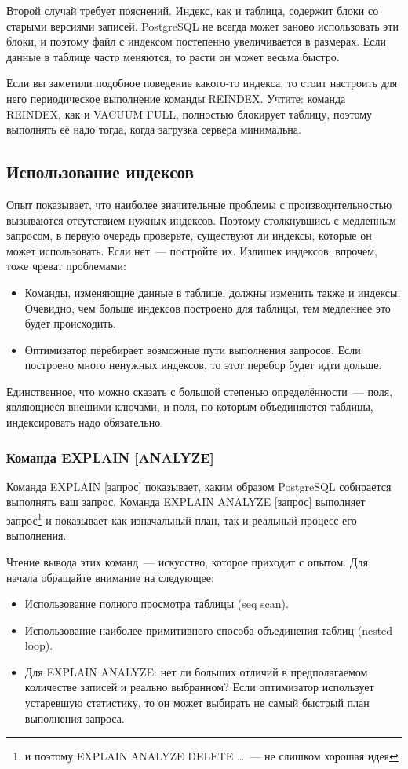 Второй случай требует пояснений. Индекс, как и таблица, содержит блоки со старыми версиями записей. PostgreSQL не всегда может 
заново использовать эти блоки, и поэтому файл с индексом постепенно увеличивается в размерах. Если данные в таблице часто меняются, 
то расти он может весьма быстро.

Если вы заметили подобное поведение какого-то индекса, то стоит настроить для него периодическое выполнение команды REINDEX. 
Учтите: команда REINDEX, как и VACUUM FULL, полностью блокирует таблицу, поэтому выполнять её надо тогда, когда загрузка 
сервера минимальна.

\subsection{Использование индексов}
Опыт показывает, что наиболее значительные проблемы с производительностью вызываются отсутствием нужных индексов. Поэтому столкнувшись 
с медленным запросом, в первую очередь проверьте, существуют ли индексы, которые он может использовать. Если нет~--- постройте их.
Излишек индексов, впрочем, тоже чреват проблемами:
\begin{itemize}
\item Команды, изменяющие данные в таблице, должны изменить также и индексы. Очевидно, чем больше индексов построено для таблицы, 
тем медленнее это будет происходить.
\item Оптимизатор перебирает возможные пути выполнения запросов. Если построено много ненужных индексов, то этот перебор будет 
идти дольше.
\end{itemize}
Единственное, что можно сказать с большой степенью определённости~--- поля, являющиеся внешими ключами, и поля, по которым 
объединяются таблицы, индексировать надо обязательно.

\subsubsection{Команда EXPLAIN [ANALYZE]}
Команда EXPLAIN [запрос] показывает, каким образом PostgreSQL собирается выполнять ваш запрос. Команда EXPLAIN ANALYZE 
[запрос] выполняет запрос\footnote{и поэтому EXPLAIN ANALYZE DELETE \dots~--- не слишком хорошая идея} и показывает как 
изначальный план, так и реальный процесс его выполнения.

Чтение вывода этих команд~--- искусство, которое приходит с опытом. Для начала обращайте внимание на следующее:
\begin{itemize}
\item Использование полного просмотра таблицы (seq scan).
\item Использование наиболее примитивного способа объединения таблиц (nested loop).
\item Для EXPLAIN ANALYZE: нет ли больших отличий в предполагаемом количестве записей и реально выбранном? 
Если оптимизатор использует устаревшую статистику, то он может выбирать не самый быстрый план выполнения запроса.
\end{itemize}

